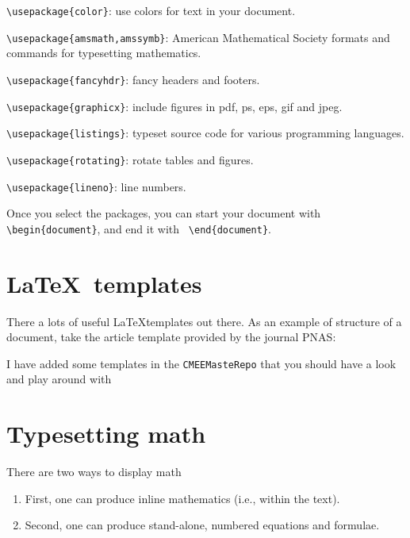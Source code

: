 \begin{compactitem}
\begin{compactitem}
  \item{\tt \textbackslash{usepackage\{color\}}}: use colors for text in your
document.
  \item{\tt \textbackslash{usepackage\{amsmath,amssymb\}}}: American
Mathematical Society formats and commands for typesetting mathematics. 
  \item{\tt \textbackslash{usepackage\{fancyhdr\}}}: fancy headers and footers. 
  \item{\tt \textbackslash{usepackage\{graphicx\}}}: include figures in pdf, ps,
eps, gif and jpeg.
  \item{\tt \textbackslash{usepackage\{listings\}}}: typeset source code for
various programming languages.
  \item{\tt \textbackslash{usepackage\{rotating\}}}: rotate tables and figures.
  \item{\tt \textbackslash{usepackage\{lineno\}}}: line numbers.
\end{compactitem}

\item Once you select the packages, you can start your document with {\tt
\textbackslash{begin\{document\}}}, and end it with {\tt
\textbackslash{end\{document\}}}.

\end{compactitem}

\section{\LaTeX~templates}

There a lots of useful \LaTeX templates out there. As an example of 
structure of a document, take the article template provided by the 
journal PNAS:

{\tiny }

I have added some templates in the {\tt CMEEMasteRepo} that you should 
have a look and play around with

\section{Typesetting math}

There are two ways to display math 

 \begin{enumerate}

  \item First, one can produce inline mathematics (i.e., within the text).
    \item Second, one can produce stand-alone, numbered equations and formulae.
    
   \end{enumerate}
   
